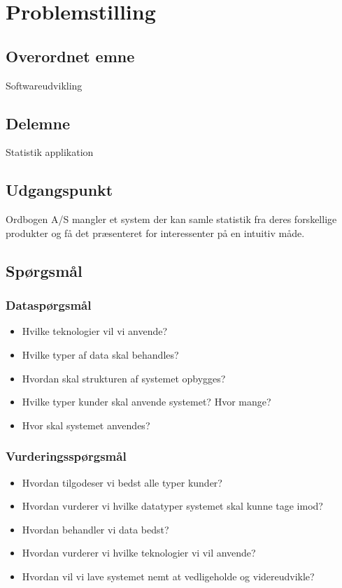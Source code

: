 \section{Problemstilling}
\subsection{Overordnet emne}
Softwareudvikling
\subsection{Delemne}
Statistik applikation
\subsection{Udgangspunkt}
Ordbogen A/S mangler et system der kan samle statistik fra deres forskellige produkter og få det præsenteret for interessenter på en intuitiv måde.
\subsection{Spørgsmål}
\subsubsection{Dataspørgsmål}
\begin{itemize}
    \item{Hvilke teknologier vil vi anvende?}
    \item{Hvilke typer af data skal behandles?}
    \item{Hvordan skal strukturen af systemet opbygges?}
    \item{Hvilke typer kunder skal anvende systemet? Hvor mange?}
    \item{Hvor skal systemet anvendes?}
\end{itemize}
\subsubsection{Vurderingsspørgsmål}
\begin{itemize}
    \item{Hvordan tilgodeser vi bedst alle typer kunder?}
    \item{Hvordan vurderer vi hvilke datatyper systemet skal kunne tage imod?}
    \item{Hvordan behandler vi data bedst?}
    \item{Hvordan vurderer vi hvilke teknologier vi vil anvende?}
    \item{Hvordan vil vi lave systemet nemt at vedligeholde og videreudvikle?}
\end{itemize}
